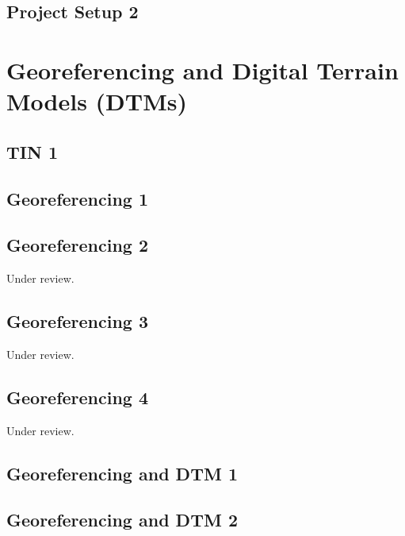 \documentclass{scrartcl}
\begin{document}
\subsection{Project Setup 2}
\label{sec:project_setup_2}
\clearpage

\section{Georeferencing and Digital Terrain Models (DTMs)}

\subsection{TIN 1}
\label{sec:tin_1}
\clearpage

\subsection{Georeferencing 1}
\label{sec:georeferencing_1}
\clearpage

\subsection{Georeferencing 2}
\label{sec:georeferencing_2}
Under review.%
\clearpage

\subsection{Georeferencing 3} %
\label{sec:georeferencing_3}
Under review.%
\clearpage

\subsection{Georeferencing 4}
\label{sec:georeferencing_4}
Under review.%
\clearpage

\subsection{Georeferencing and DTM 1}
\label{sec:georef_tin_1}
\clearpage

\subsection{Georeferencing and DTM 2}
\label{sec:georef_tin_2}
\clearpage
\end{document}
